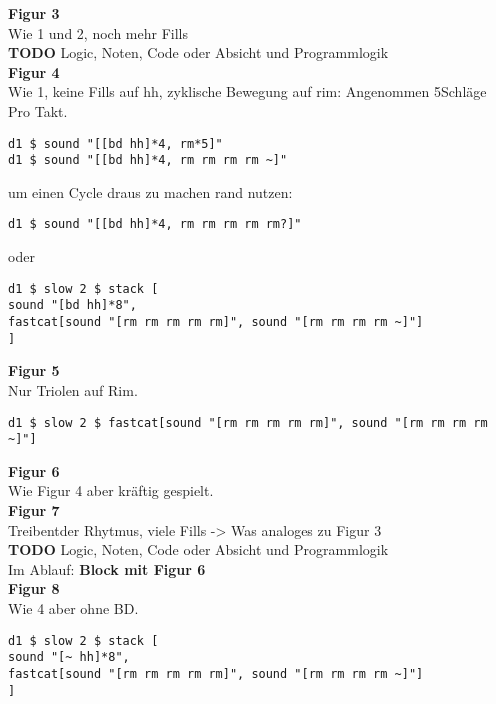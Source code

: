 \documentclass[
10pt, %
a4paper, %
oneside, %
headinclude,footinclude, %
BCOR5mm, %
]{scrartcl}
\begin{document}
\noindent \textbf{Figur 3}\\
Wie 1 und 2, noch mehr Fills\\
{\color{red}\textbf{TODO}} Logic, Noten, Code oder Absicht und Programmlogik\\

\noindent \textbf{Figur 4}\\
Wie 1, keine Fills auf hh,
zyklische Bewegung auf rim: Angenommen 5Schläge Pro Takt.

\begin{lstlisting}
d1 $ sound "[[bd hh]*4, rm*5]"
d1 $ sound "[[bd hh]*4, rm rm rm rm ~]"
\end{lstlisting}

um einen Cycle draus zu machen rand nutzen:

\begin{lstlisting}
d1 $ sound "[[bd hh]*4, rm rm rm rm rm?]"
\end{lstlisting}

oder

\begin{lstlisting}
d1 $ slow 2 $ stack [
sound "[bd hh]*8",
fastcat[sound "[rm rm rm rm rm]", sound "[rm rm rm rm ~]"]
]
\end{lstlisting}



\noindent \textbf{Figur 5}\\
Nur Triolen auf Rim.
\begin{lstlisting}
d1 $ slow 2 $ fastcat[sound "[rm rm rm rm rm]", sound "[rm rm rm rm ~]"]
\end{lstlisting}


\noindent \textbf{Figur 6}\\
Wie Figur 4 aber kräftig gespielt.\\

\noindent \textbf{Figur 7}\\
Treibentder Rhytmus, viele Fills -> Was analoges zu Figur 3\\
{\color{red}\textbf{TODO}} Logic, Noten, Code oder Absicht und Programmlogik\\

\noindent Im Ablauf: \textbf{Block mit Figur 6}\\

\noindent \textbf{Figur 8}\\
Wie 4 aber ohne BD.
\begin{lstlisting}
d1 $ slow 2 $ stack [
sound "[~ hh]*8",
fastcat[sound "[rm rm rm rm rm]", sound "[rm rm rm rm ~]"]
]
\end{lstlisting}
\end{document}

